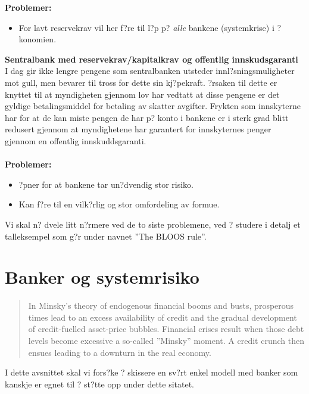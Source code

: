 \documentclass[a4paper,notitlepage]{article}
\begin{document}
\noindent\textbf{Problemer:}\\
\begin{itemize}
\item For lavt reservekrav vil her f?re til l?p p? \emph{alle} bankene (systemkrise) i ?konomien.
\end{itemize}

\noindent\textbf{Sentralbank med reservekrav/kapitalkrav og offentlig innskudsgaranti}\\
\noindent I dag gir ikke lengre pengene som sentralbanken utsteder innl?sningsmuligheter mot gull, men bevarer til tross for dette sin kj?pekraft.  ?rsaken til dette er knyttet til at myndigheten gjennom lov har vedtatt at disse pengene er det gyldige betalingsmiddel for betaling av skatter avgifter. Frykten som innskyterne har for at de kan miste pengen de har p? konto i bankene er i sterk grad blitt redusert gjennom at myndighetene har garantert for innskyternes penger gjennom en offentlig innskuddsgaranti.\bigskip\\
\noindent\textbf{\\Problemer:}\\
\begin{itemize}
\item ?pner for at bankene tar un?dvendig stor risiko.
\item Kan f?re til en vilk?rlig og stor omfordeling av formue.
\end{itemize}
Vi skal n? dvele litt n?rmere ved de to siste problemene, ved ? studere i detalj et talleksempel som g?r under navnet ''The BLOOS rule''.
\section{Banker og systemrisiko}
\begin{quotation}
In Minsky's theory of endogenous financial booms and busts, prosperous
times lead to an excess availability of credit and the gradual development of credit-fuelled asset-price bubbles.  Financial crises result when those debt levels become excessive a so-called ''Minsky'' moment.  A credit crunch then ensues leading to a downturn in the real economy.
\end{quotation}
I dette avsnittet skal vi fors?ke ? skissere en sv?rt enkel modell med banker som kanskje er egnet til ? st?tte opp under dette sitatet.
\end{document}
